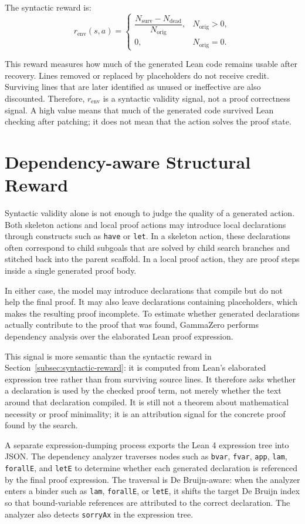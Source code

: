 \documentclass[en]{uet_awesome_thesis/uet-awesome-thesis}
\begin{document}
The syntactic reward is:
\[
r_{\mathrm{env}}(s,a) =
\begin{cases}
\dfrac{N_{\text{surv}} - N_{\text{dead}}}{N_{\text{orig}}},
& N_{\text{orig}} > 0, \\
0, & N_{\text{orig}} = 0.
\end{cases}
\]

This reward measures how much of the generated Lean code remains usable after recovery. Lines removed
or replaced by placeholders do not receive credit. Surviving lines that are later identified as unused or
ineffective are also discounted. Therefore, \(r_{\mathrm{env}}\) is a syntactic validity signal, not a proof
correctness signal. A high value means that much of the generated code survived Lean checking after patching; 
it does not mean that the action solves the proof state.

\section{Dependency-aware Structural Reward}
\label{subsec:dep-reward}

Syntactic validity alone is not enough to judge the quality of a generated action. Both skeleton actions
and local proof actions may introduce local declarations through constructs such as \texttt{have} or
\texttt{let}. In a skeleton action, these declarations often correspond to child subgoals that are solved by
child search branches and stitched back into the parent scaffold. In a local proof action, they are proof
steps inside a single generated proof body.

In either case, the model may introduce declarations that compile but do not help the final proof. It may
also leave declarations containing placeholders, which makes the resulting proof incomplete. To estimate
whether generated declarations actually contribute to the proof that was found, GammaZero performs
dependency analysis over the elaborated Lean proof expression.

This signal is more semantic than the syntactic reward in Section~\ref{subsec:syntactic-reward}: it is computed
from Lean's elaborated expression tree rather than from surviving source lines. It therefore asks whether
a declaration is used by the checked proof term, not merely whether the text around that declaration
compiled. It is still not a theorem about mathematical necessity or proof minimality; it is an attribution
signal for the concrete proof found by the search.

A separate expression-dumping process exports the Lean 4 expression tree into JSON. The dependency
analyzer traverses nodes such as \texttt{bvar}, \texttt{fvar}, \texttt{app}, \texttt{lam}, \texttt{forallE}, and
\texttt{letE} to determine whether each generated declaration is referenced by the final proof expression.
The traversal is De Bruijn-aware: when the analyzer enters a binder such as \texttt{lam}, \texttt{forallE},
or \texttt{letE}, it shifts the target De Bruijn index so that bound-variable references are attributed to
the correct declaration. The analyzer also detects \texttt{sorryAx} in the expression tree.
\end{document}
